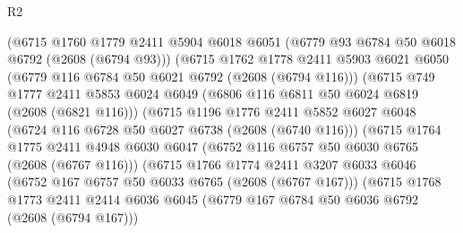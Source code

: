 \begin{lexlean}{R2}
\begin{coremodule}
                            (@6715
                              @1760
                              @1779
                              @2411
                              @5904
                              @6018
                              @6051
                              (@6779 @93 @6784 @50 @6018 @6792 (@2608 (@6794 @93)))
                              (@6715
                                @1762
                                @1778
                                @2411
                                @5903
                                @6021
                                @6050
                                (@6779 @116 @6784 @50 @6021 @6792 (@2608 (@6794 @116)))
                                (@6715
                                  @749
                                  @1777
                                  @2411
                                  @5853
                                  @6024
                                  @6049
                                  (@6806 @116 @6811 @50 @6024 @6819 (@2608 (@6821 @116)))
                                  (@6715
                                    @1196
                                    @1776
                                    @2411
                                    @5852
                                    @6027
                                    @6048
                                    (@6724 @116 @6728 @50 @6027 @6738 (@2608 (@6740 @116)))
                                    (@6715
                                      @1764
                                      @1775
                                      @2411
                                      @4948
                                      @6030
                                      @6047
                                      (@6752 @116 @6757 @50 @6030 @6765 (@2608 (@6767 @116)))
                                      (@6715
                                        @1766
                                        @1774
                                        @2411
                                        @3207
                                        @6033
                                        @6046
                                        (@6752 @167 @6757 @50 @6033 @6765 (@2608 (@6767 @167)))
                                        (@6715
                                          @1768
                                          @1773
                                          @2411
                                          @2414
                                          @6036
                                          @6045
                                          (@6779 @167 @6784 @50 @6036 @6792 (@2608 (@6794 @167)))

\end{coremodule}
\end{lexlean}
